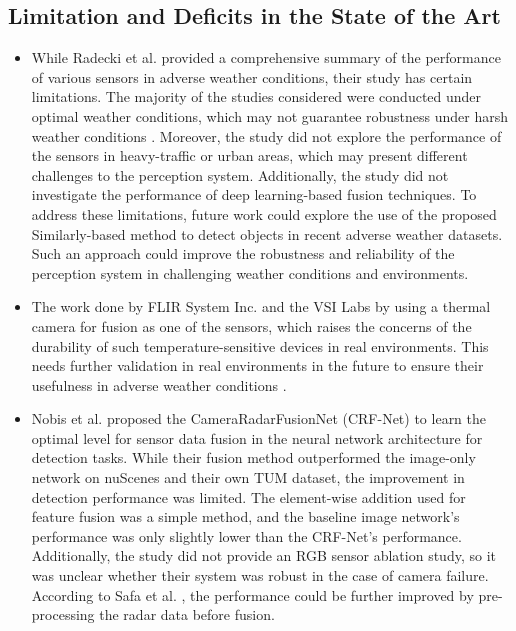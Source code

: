 \documentclass[rnd]{mas_proposal}
\begin{document}
\subsection{Limitation and Deficits in the State of the Art}
\begin{itemize}

    
      \item While Radecki et al. \cite{radecki2016all} provided a comprehensive summary of the performance of various sensors in adverse weather conditions, their study has certain limitations. The majority of the studies considered were conducted under optimal weather conditions, which may not guarantee robustness under harsh weather conditions \cite{emzivat2018formal}. Moreover, the study did not explore the performance of the sensors in heavy-traffic or urban areas, which may present different challenges to the perception system. Additionally, the study did not investigate the performance of deep learning-based fusion techniques. To address these limitations, future work could explore the use of the proposed Similarly-based method to detect objects in recent adverse weather datasets. Such an approach could improve the robustness and reliability of the perception system in challenging weather conditions and environments.
      \item The work done by FLIR System Inc. \cite{fused_aeb} and the VSI Labs \cite{VSILabs} by using a thermal camera for fusion as one of the sensors, which raises the concerns of the durability of such temperature-sensitive devices in real environments. This needs further validation in real environments in the future to ensure their usefulness in adverse weather conditions \cite{zang2019impact}.
      \item Nobis et al. \cite{nobis2019deep} proposed the CameraRadarFusionNet (CRF-Net) to learn the optimal level for sensor data fusion in the neural network architecture for detection tasks. While their fusion method outperformed the image-only network on nuScenes \cite{caesar2020nuscenes} and their own TUM dataset, the improvement in detection performance was limited. The element-wise addition used for feature fusion was a simple method, and the baseline image network's performance was only slightly lower than the CRF-Net's performance. Additionally, the study did not provide an RGB sensor ablation study, so it was unclear whether their system was robust in the case of camera failure. According to Safa et al. \cite{safa2021fail}, the performance could be further improved by pre-processing the radar data before fusion.

\end{itemize}
\end{document}
